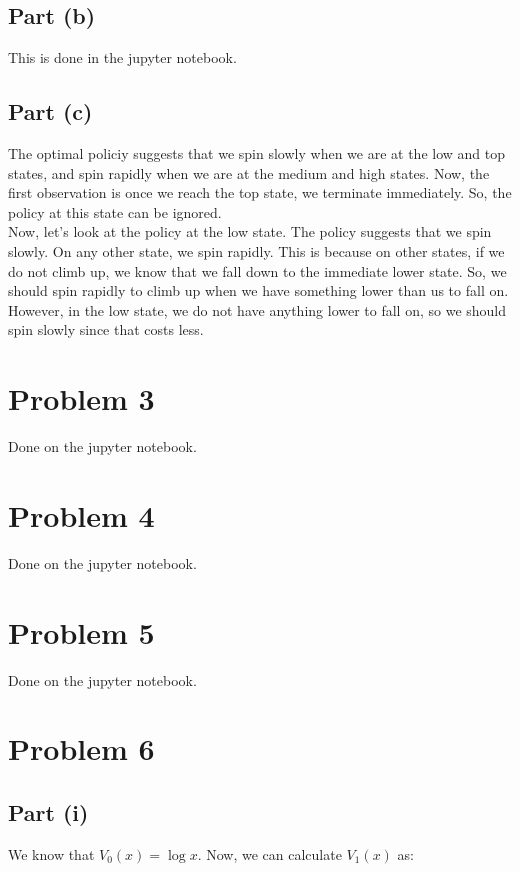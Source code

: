 \documentclass[a4paper]{article}
\begin{document}
\subsection*{Part (b)}
This is done in the jupyter notebook.

\subsection*{Part (c)}
The optimal policiy suggests that we spin slowly when we are at the low and top states, and spin rapidly when we are at the medium and high states. Now, the first observation is once we reach the top state, we terminate immediately. So, the policy at this state can be ignored.\\

\noindent Now, let's look at the policy at the low state. The policy suggests that we spin slowly. On any other state, we spin rapidly. This is because on other states, if we do not climb up, we know that we fall down to the immediate lower state. So, we should spin rapidly to climb up when we have something lower than us to fall on. However, in the low state, we do not have anything lower to fall on, so we should spin slowly since that costs less.\\


\newpage
\section*{Problem 3}
Done on the jupyter notebook.

\section*{Problem 4}
Done on the jupyter notebook.

\section*{Problem 5}
Done on the jupyter notebook.

\section*{Problem 6}
\subsection*{Part (i)}
\noindent We know that $V_0(x) = \log x$. Now, we can calculate $V_1(x)$ as:
\end{document}
